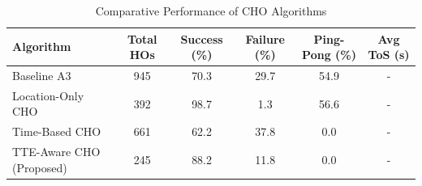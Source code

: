 \begin{table}[htbp]
\centering
\caption{Comparative Performance of CHO Algorithms}
\label{tab:kpi_comparison}
\begin{tabular}{lccccc}
\hline
Algorithm & Total HOs & Success (\%) & Failure (\%) & Ping-Pong (\%) & Avg ToS (s) \\
\hline
Baseline A3 & 945 & 70.3 & 29.7 & 54.9 & - \\
Location-Only CHO & 392 & 98.7 & 1.3 & 56.6 & - \\
Time-Based CHO & 661 & 62.2 & 37.8 & 0.0 & - \\
TTE-Aware CHO (Proposed) & 245 & 88.2 & 11.8 & 0.0 & - \\
\hline
\end{tabular}
\end{table}
